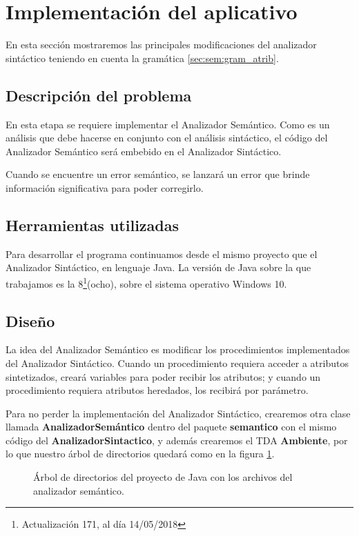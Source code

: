 \section{Implementación del aplicativo}
En esta sección mostraremos las principales modificaciones del analizador sintáctico teniendo en cuenta la gramática \ref{sec:sem:gram_atrib}. 

\subsection{Descripción del problema}
En esta etapa se requiere implementar el Analizador Semántico. Como es un análisis que debe hacerse en conjunto con el análisis sintáctico, el código del Analizador Semántico será embebido en el Analizador Sintáctico.

Cuando se encuentre un error semántico, se lanzará un error que brinde información significativa para poder corregirlo. 

\subsection{Herramientas utilizadas}
Para desarrollar el programa continuamos desde el mismo proyecto que el Analizador Sintáctico, en lenguaje Java. La versión de Java sobre la que trabajamos es la 8\footnote{Actualización 171, al día 14/05/2018}(ocho), sobre el sistema operativo Windows 10. 

\subsection{Diseño}
La idea del Analizador Semántico es modificar los procedimientos implementados del Analizador Sintáctico. Cuando un procedimiento requiera acceder a atributos sintetizados, creará variables para poder recibir los atributos; y cuando un procedimiento requiera atributos heredados, los recibirá por parámetro. 

Para no perder la implementación del Analizador Sintáctico, crearemos otra clase llamada \textbf{AnalizadorSemántico} dentro del paquete \textbf{semantico} con el mismo código del \textbf{AnalizadorSintactico}, y además crearemos el TDA \textbf{Ambiente}, por lo que nuestro árbol de directorios quedará como en la figura \ref{fig:arbol_dir_4}.

\begin{figure}[H]
\caption{Árbol de directorios del proyecto de Java con los archivos del analizador semántico.}
\label{fig:arbol_dir_4}
\end{figure}

